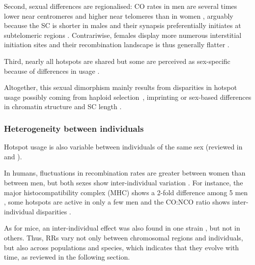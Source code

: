 Second, sexual differences are regionalised: CO rates in men are several times lower near centromeres and higher near telomeres than in women \citep[reviewed in][]{buard2007playing}, arguably because the SC is shorter in males \citep{tease2004intersex} and their synapsis preferentially initiates at subtelomeric regions \citep{brown2005meiotic}.
Contrariwise, females display more numerous interstitial initiation sites and their recombination landscape is thus generally flatter \citep{paigen2008recombinational}.

Third, nearly all hotspots are shared \citep{bherer2017refined} but some are perceived as sex-specific because of differences in usage \citep{shiroishi1990recombinational,shiroishi1991genetic}.

Altogether, this sexual dimorphism mainly results from disparities in hotspot usage \citep{brick2018extensive} possibly coming from haploid selection \citep{lenormand2005recombination}, imprinting \citep{lercher2003imprinted} or sex-based differences in chromatin structure \citep{gerton2005homologous} and SC length \citep{petkov2007crossover}.


\subsubsection{Heterogeneity between individuals}

Hotspot usage is also variable between individuals of the same sex (reviewed in \citealp{popa2011evolution} and \citealp{capilla2016mammalian}).

In humans, fluctuations in recombination rates are greater between women than between men, but both sexes show inter-individual variation \citep{cheung2007polymorphic}.
For instance, the major histocompatibility complex (MHC) shows a 2-fold difference among 5 men \citep{yu1996individual}, some hotspots are active in only a few men \citep{neumann2006polymorphism} and the CO:NCO ratio shows inter-individual disparities \citep{jeffreys2005factors,sarbajna2012major}.

As for mice, an inter-individual effect was also found in one strain \citep{koehler2002genetic}, but not in others.
Thus, RRs vary not only between chromosomal regions and individuals, but also across populations and species, which indicates that they evolve with time, as reviewed in the following section.





